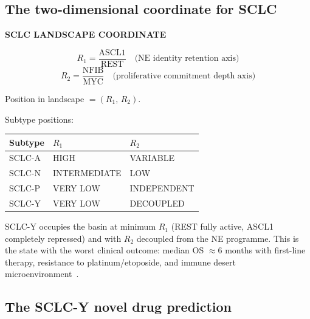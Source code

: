 \documentclass[11pt, a4paper]{article}
\begin{document}
\subsection{The two-dimensional coordinate for SCLC}

\begin{theoremenv}
\textbf{SCLC LANDSCAPE COORDINATE}

\[
R_1 = \frac{\text{ASCL1}}{\text{REST}}
\quad\text{(NE identity retention axis)}
\]
\[
R_2 = \frac{\text{NFIB}}{\text{MYC}}
\quad\text{(proliferative commitment depth axis)}
\]

Position in landscape $= (R_1,\, R_2)$.

Subtype positions:
\begin{center}
\begin{tabular}{lll}
\toprule
Subtype & $R_1$ & $R_2$ \\
\midrule
SCLC-A & HIGH & VARIABLE \\
SCLC-N & INTERMEDIATE & LOW \\
SCLC-P & VERY LOW & INDEPENDENT \\
SCLC-Y & VERY LOW & DECOUPLED \\
\bottomrule
\end{tabular}
\end{center}
\end{theoremenv}

SCLC-Y occupies the basin at minimum $R_1$ (REST fully
active, ASCL1 completely repressed) and with $R_2$
decoupled from the NE programme. This is the state
with the worst clinical outcome: median OS
${\approx}6$ months with first-line therapy, resistance
to platinum/etoposide, and immune desert
microenvironment~\cite{gay2021}.

\subsection{The SCLC-Y novel drug prediction}
\end{document}
